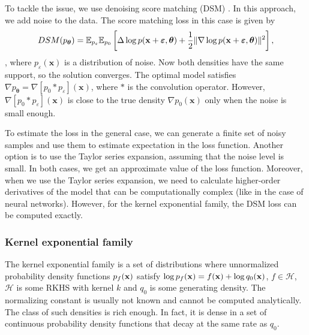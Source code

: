 To tackle the issue, we use denoising score matching (DSM) \cite{Denoising}.
In this approach, we add noise to the data.
The score matching loss in this case is given by
\begin{equation}
    \label{eq:denoising_sm}
    DSM(p_{\bm{\theta}}) = \mathbb{E}_{p_{\varepsilon}}\mathbb{E}_{p_0}\left[\Delta \log p({\bf x} + {\bm \varepsilon}, {\bm \theta}) + \frac{1}{2}\|\nabla \log p({\bf x} + {\bm \varepsilon}, {\bm \theta})\|^2\right],
\end{equation},
where $p_{\varepsilon}(\bm{x})$ is a distribution of noise.
Now both densities have the same support, so the solution converges.
The optimal model satisfies
$\nabla p_{\bm{\theta}} = \nabla \left [p_0 * p_{\varepsilon} \right ] (\bm{x})$,
where $*$ is the convolution operator.
However, $\nabla \left [p_0 * p_{\varepsilon} \right ] (\bm{x})$ is
close to the true density $\nabla p_0(\bm{x})$
only when the noise is small enough.

To estimate the loss in the general case, we can generate a finite set of
noisy samples and use them to estimate expectation in the loss function.
Another option is to use the Taylor series expansion, assuming that the noise level is small.
In both cases, we get an approximate value of the loss function.
Moreover, when we use the Taylor series expansion, we need to calculate
higher-order derivatives of the model that can be computationally complex
(like in the case of neural networks).
However, for the kernel exponential family, the DSM loss
can be computed exactly.

\subsubsection{Kernel exponential family}
The kernel exponential family is a set of distributions where unnormalized
probability density functions
$p_f(\bf{x})$ satisfy
$\log p_f({\bf x}) = f({\bf x}) + \log q_0({\bf x})$,
$f \in \mathcal{H}$,
$\mathcal{H}$ is some RKHS with kernel $k$ and
$q_0$ is some generating density.
The normalizing constant is usually not known and cannot be computed analytically.
The class of such densities is rich enough.
In fact, it is dense in a set of continuous probability density functions
that decay at the same rate as $q_0$.


